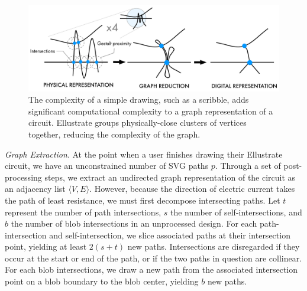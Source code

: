 \documentclass{sigchi}
\begin{document}
      \begin{figure}[t]
        \centering
        \includegraphics[width=1.0\columnwidth]{figures/gestalt.pdf}
        \caption{The complexity of a simple drawing, such as a scribble, adds significant computational complexity to a graph representation of a circuit. Ellustrate groups physically-close clusters of vertices together, reducing the complexity of the graph. }
        \label{fig:gestalt}
        \vspace{-20pt}
      \end{figure}

      \textit{Graph Extraction}.
      At the point when a user finishes drawing their Ellustrate circuit, we have an unconstrained number of SVG paths $p$. 
      Through a set of post-processing steps, we extract an undirected graph representation of the circuit as an adjacency list $\langle V, E \rangle$. However, because the direction of electric current takes the path of least resistance, we must first decompose intersecting paths.
    Let $t$ represent the number of path intersections, $s$ the number of self-intersections, and $b$ the number of blob intersections in an unprocessed design. For each path-intersection and self-intersection, we slice associated paths at their intersection point, yielding at least $2(s + t)$ new paths. Intersections are disregarded if they occur at the start or end of the path, or if the two paths in question are collinear. For each blob intersections, we draw a new path from the associated intersection point on a blob boundary to the blob center, yielding $b$ new paths. 
    
\end{document}
